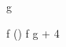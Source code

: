 \documentclass[12pt,a4paper]{book}
\begin{document}


\begin{eqcode}{g}{ }{ }{}
   \lend
\end{eqcode}

\begin{eqcode}{\mu}{ }{ }{}
  f \in (\rightarrow {}) \lend
  f \gets g + 4 \lend %
   \lend
\end{eqcode}
\end{document}
